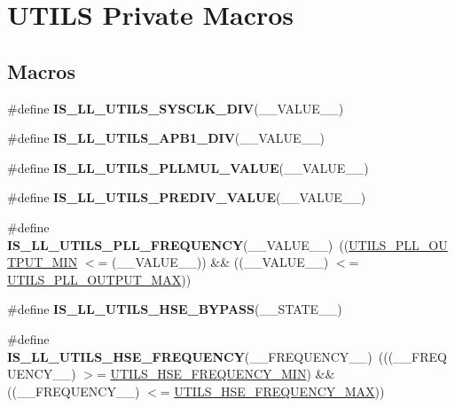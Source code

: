 \hypertarget{group___u_t_i_l_s___l_l___private___macros}{}\section{U\+T\+I\+LS Private Macros}
\label{group___u_t_i_l_s___l_l___private___macros}
\subsection*{Macros}
\begin{DoxyCompactItemize}
\item 
\#define {\bfseries I\+S\+\_\+\+L\+L\+\_\+\+U\+T\+I\+L\+S\+\_\+\+S\+Y\+S\+C\+L\+K\+\_\+\+D\+IV}(\+\_\+\+\_\+\+V\+A\+L\+U\+E\+\_\+\+\_\+)
\item 
\#define {\bfseries I\+S\+\_\+\+L\+L\+\_\+\+U\+T\+I\+L\+S\+\_\+\+A\+P\+B1\+\_\+\+D\+IV}(\+\_\+\+\_\+\+V\+A\+L\+U\+E\+\_\+\+\_\+)
\item 
\#define {\bfseries I\+S\+\_\+\+L\+L\+\_\+\+U\+T\+I\+L\+S\+\_\+\+P\+L\+L\+M\+U\+L\+\_\+\+V\+A\+L\+UE}(\+\_\+\+\_\+\+V\+A\+L\+U\+E\+\_\+\+\_\+)
\item 
\#define {\bfseries I\+S\+\_\+\+L\+L\+\_\+\+U\+T\+I\+L\+S\+\_\+\+P\+R\+E\+D\+I\+V\+\_\+\+V\+A\+L\+UE}(\+\_\+\+\_\+\+V\+A\+L\+U\+E\+\_\+\+\_\+)
\item 
\mbox{\label{group___u_t_i_l_s___l_l___private___macros_gafdc929d67ee197e1e27a26d5474bca63}} 
\#define {\bfseries I\+S\+\_\+\+L\+L\+\_\+\+U\+T\+I\+L\+S\+\_\+\+P\+L\+L\+\_\+\+F\+R\+E\+Q\+U\+E\+N\+CY}(\+\_\+\+\_\+\+V\+A\+L\+U\+E\+\_\+\+\_\+)~((\hyperlink{group___u_t_i_l_s___l_l___private___constants_gad04670e4dd1d91d02b6ac32498d74d81}{U\+T\+I\+L\+S\+\_\+\+P\+L\+L\+\_\+\+O\+U\+T\+P\+U\+T\+\_\+\+M\+IN} $<$= (\+\_\+\+\_\+\+V\+A\+L\+U\+E\+\_\+\+\_\+)) \&\& ((\+\_\+\+\_\+\+V\+A\+L\+U\+E\+\_\+\+\_\+) $<$= \hyperlink{group___u_t_i_l_s___l_l___private___constants_ga3edafc754826e07341fecc87bf2c9a39}{U\+T\+I\+L\+S\+\_\+\+P\+L\+L\+\_\+\+O\+U\+T\+P\+U\+T\+\_\+\+M\+AX}))
\item 
\#define {\bfseries I\+S\+\_\+\+L\+L\+\_\+\+U\+T\+I\+L\+S\+\_\+\+H\+S\+E\+\_\+\+B\+Y\+P\+A\+SS}(\+\_\+\+\_\+\+S\+T\+A\+T\+E\+\_\+\+\_\+)
\item 
\mbox{\label{group___u_t_i_l_s___l_l___private___macros_ga731945d8182d85f4912bac7b43be267e}} 
\#define {\bfseries I\+S\+\_\+\+L\+L\+\_\+\+U\+T\+I\+L\+S\+\_\+\+H\+S\+E\+\_\+\+F\+R\+E\+Q\+U\+E\+N\+CY}(\+\_\+\+\_\+\+F\+R\+E\+Q\+U\+E\+N\+C\+Y\+\_\+\+\_\+)~(((\+\_\+\+\_\+\+F\+R\+E\+Q\+U\+E\+N\+C\+Y\+\_\+\+\_\+) $>$= \hyperlink{group___u_t_i_l_s___l_l___private___constants_ga7bc514193367ab0d598fe4c3bedd6066}{U\+T\+I\+L\+S\+\_\+\+H\+S\+E\+\_\+\+F\+R\+E\+Q\+U\+E\+N\+C\+Y\+\_\+\+M\+IN}) \&\& ((\+\_\+\+\_\+\+F\+R\+E\+Q\+U\+E\+N\+C\+Y\+\_\+\+\_\+) $<$= \hyperlink{group___u_t_i_l_s___l_l___private___constants_gae3407ef407af85f72bbba3db982a1826}{U\+T\+I\+L\+S\+\_\+\+H\+S\+E\+\_\+\+F\+R\+E\+Q\+U\+E\+N\+C\+Y\+\_\+\+M\+AX}))
\end{DoxyCompactItemize}


